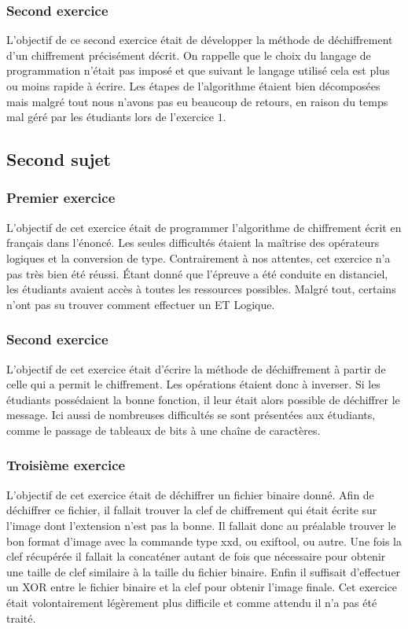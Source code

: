 \documentclass[12pt]{article}
\begin{document}
\subsubsection{Second exercice}

L'objectif de ce second exercice était de développer la méthode de déchiffrement d'un chiffrement précisément décrit. On rappelle que le choix du langage de programmation n'était pas imposé et que suivant le langage utilisé cela est plus ou moins rapide à écrire. Les étapes de l'algorithme étaient bien décomposées mais malgré tout nous n'avons pas eu beaucoup de retours, en raison du temps mal géré par les étudiants lors de l'exercice $1$.

\pagebreak

\subsection{Second sujet}
\subsubsection{Premier exercice}
L'objectif de cet exercice était de programmer l'algorithme de chiffrement écrit en français dans l'énoncé. Les seules difficultés étaient la maîtrise des opérateurs logiques et la conversion de type. Contrairement à nos attentes, cet exercice n'a pas très bien été réussi. Étant donné que l'épreuve a été conduite en distanciel, les étudiants avaient accès à toutes les ressources possibles. Malgré tout, certains n'ont pas su trouver comment effectuer un \textsf{ET Logique}.

\subsubsection{Second exercice}
L'objectif de cet exercice était d'écrire la méthode de déchiffrement à partir de celle qui a permit le chiffrement. Les opérations étaient donc à inverser. Si les étudiants possédaient la bonne fonction, il leur était alors possible de déchiffrer le message. Ici aussi de nombreuses difficultés se sont présentées aux étudiants, comme le passage de tableaux de bits à une chaîne de caractères.

\subsubsection{Troisième exercice}
L'objectif de cet exercice était de déchiffrer un fichier binaire donné. Afin de déchiffrer ce fichier, il fallait trouver la clef de chiffrement qui était écrite sur l'image dont l'extension n'est pas la bonne. Il fallait donc au préalable trouver le bon format d'image avec la commande type \textsf{xxd}, ou \textsf{exiftool}, ou autre. Une fois la clef récupérée il fallait la concaténer autant de fois que nécessaire pour obtenir une taille de clef similaire à la taille du fichier binaire. Enfin il suffisait d'effectuer un \textsf{XOR} entre le fichier binaire et la clef pour obtenir l'image finale. Cet exercice était volontairement légèrement plus difficile et comme attendu il n'a pas été traité.
\end{document}
